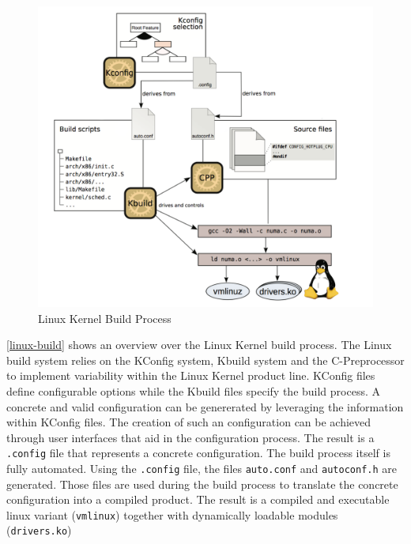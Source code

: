 \documentclass[a4paper]{article}
\begin{document}
\begin{figure}[h] 
  \centering
  \begin{minipage}[b]{1\textwidth} 
    \caption[Linux build process]{Linux Kernel Build Process \cite{Dietrich:2012:RAV:2362536.2362544}}\label{linux-build}
    \includegraphics[width=1\textwidth]{img/linux-build2.png}
  \end{minipage}
\end{figure}

\autoref{linux-build} shows an overview over the Linux Kernel build process. The Linux build system relies on the KConfig system, Kbuild system and the C-Preprocessor to implement variability within the Linux Kernel product line. KConfig files  define configurable options while the Kbuild files specify the build process. A concrete and valid configuration can be genererated by leveraging the information within KConfig files. The creation of such an configuration can be achieved through user interfaces that aid in the configuration process. The result is a \texttt{.config} file that represents a concrete configuration. The build process itself is fully automated. Using the \texttt{.config} file, the files \texttt{auto.conf} and \texttt{autoconf.h} are generated. Those files are used during the build process to translate the concrete configuration into a compiled product. The result is a compiled and executable linux variant (\texttt{vmlinux}) together with dynamically loadable modules (\texttt{drivers.ko})
\end{document}
